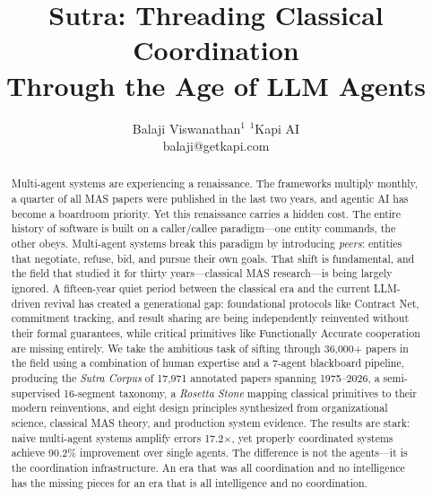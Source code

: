 \documentclass{article}
\title{Sutra: Threading Classical Coordination\\
Through the Age of LLM Agents}
\author{
Balaji Viswanathan$^1$
\affiliations
$^1$Kapi AI\\
\emails
balaji@getkapi.com
}
\begin{document}
\maketitle

\begin{abstract}
Multi-agent systems are experiencing a renaissance.  The frameworks
multiply monthly, a quarter of all MAS papers were published in the
last two years, and agentic AI has become a boardroom priority.  Yet
this renaissance carries a hidden cost.  The entire history of software
is built on a caller/callee paradigm---one entity commands, the other
obeys.  Multi-agent systems break this paradigm by introducing
\emph{peers}: entities that negotiate, refuse, bid, and pursue their
own goals.  That shift is fundamental, and the field that studied it for
thirty years---classical MAS research---is being largely ignored.
A fifteen-year quiet period between the classical era and the current
LLM-driven revival has created a generational gap: foundational
protocols like Contract Net, commitment tracking, and result sharing are
being independently reinvented without their formal guarantees, while
critical primitives like Functionally Accurate cooperation are missing
entirely.  We take the ambitious task of sifting through 36,000+ papers
in the field using a combination of human expertise and a 7-agent
blackboard pipeline, producing the \emph{Sutra Corpus} of 17,971
annotated papers spanning 1975--2026, a semi-supervised 16-segment
taxonomy, a \emph{Rosetta Stone} mapping classical primitives to their
modern reinventions, and eight design principles synthesized from
organizational science, classical MAS theory, and production system
evidence.  The results are stark: naive multi-agent systems amplify
errors 17.2$\times$, yet properly coordinated systems achieve 90.2\%
improvement over single agents.  The difference is not the agents---it
is the coordination infrastructure.  An era that was all coordination
and no intelligence
has the missing pieces for an era that is all intelligence and no
coordination.
\end{abstract}



\end{document}
